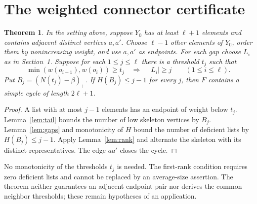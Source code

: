 \documentclass[11pt,letterpaper]{article}
\newtheorem{theorem}{Theorem}[section]
\theoremstyle{remark}\newtheorem{remark}[theorem]{Remark}
\begin{document}
\section{The weighted connector certificate}
\begin{theorem}\label{thm:main}
In the setting above, suppose $Y_0$ has at least $\ell+1$ elements and contains adjacent distinct vertices $a,a'$. Choose $\ell-1$ other elements of $Y_0$, order them by nonincreasing weight, and use $a,a'$ as endpoints. For each gap choose $L_i$ as in Section~1. Suppose for each $1\le j\le\ell$ there is a threshold $t_j$ such that
\[
 \min(w(o_{i-1}),w(o_i))\ge t_j\quad\Longrightarrow\quad |L_i|\ge j
 \qquad(1\le i\le\ell).
\]
Put $B_j=(N(t_j)-\beta)_+$. If $H(B_j)\le j-1$ for every $j$, then $F$ contains a simple cycle of length $2\ell+1$.
\end{theorem}
\begin{proof}
A list with at most $j-1$ elements has an endpoint of weight below $t_j$. Lemma~\ref{lem:tail} bounds the number of low skeleton vertices by $B_j$. Lemma~\ref{lem:gaps} and monotonicity of $H$ bound the number of deficient lists by $H(B_j)\le j-1$. Apply Lemma~\ref{lem:rank} and alternate the skeleton with its distinct representatives. The edge $aa'$ closes the cycle.
\end{proof}
No monotonicity of the thresholds $t_j$ is needed. The first-rank condition requires zero deficient lists and cannot be replaced by an average-size assertion. The theorem neither guarantees an adjacent endpoint pair nor derives the common-neighbor thresholds; these remain hypotheses of an application.
\end{document}
